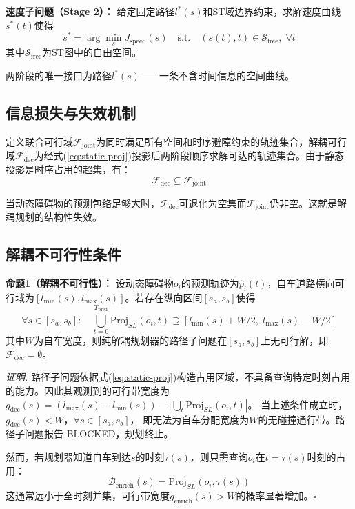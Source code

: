 \documentclass[a4paper,11pt]{article}
\begin{document}
\textbf{速度子问题（Stage 2）：} 给定固定路径$l^*(s)$和ST域边界约束，求解速度曲线$s^*(t)$使得
\begin{equation}
  s^* = \arg\min_{s} J_{\text{speed}}(s) \quad \text{s.t.} \quad (s(t), t) \in \mathcal{S}_{\text{free}}, \;\forall t
\end{equation}
其中$\mathcal{S}_{\text{free}}$为ST图中的自由空间。

两阶段的唯一接口为路径$l^*(s)$——一条不含时间信息的空间曲线。

\subsection{信息损失与失效机制}

定义联合可行域$\mathcal{F}_{\text{joint}}$为同时满足所有空间和时序避障约束的轨迹集合，解耦可行域$\mathcal{F}_{\text{dec}}$为经式(\ref{eq:static-proj})投影后两阶段顺序求解可达的轨迹集合。由于静态投影是时序占用的超集，有：
\begin{equation}
  \mathcal{F}_{\text{dec}} \subseteq \mathcal{F}_{\text{joint}}
\end{equation}

当动态障碍物的预测包络足够大时，$\mathcal{F}_{\text{dec}}$可退化为空集而$\mathcal{F}_{\text{joint}}$仍非空。这就是解耦规划的结构性失效。

\subsection{解耦不可行性条件}

\textbf{命题1（解耦不可行性）：} 设动态障碍物$o_i$的预测轨迹为$\hat{p}_i(t)$，自车道路横向可行域为$[l_{\min}(s), l_{\max}(s)]$。若存在纵向区间$[s_a, s_b]$使得
\begin{equation}
  \forall s \in [s_a, s_b]: \quad \bigcup_{t=0}^{T_{\text{pred}}} \text{Proj}_{SL}(o_i, t) \supseteq [l_{\min}(s) + W/2,\; l_{\max}(s) - W/2]
\end{equation}
其中$W$为自车宽度，则纯解耦规划器的路径子问题在$[s_a, s_b]$上无可行解，即$\mathcal{F}_{\text{dec}} = \emptyset$。

\textit{证明.} 路径子问题依据式(\ref{eq:static-proj})构造占用区域，不具备查询特定时刻占用的能力。因此其观测到的可行带宽度为
$g_{\text{dec}}(s) = (l_{\max}(s) - l_{\min}(s)) - |\bigcup_t \text{Proj}_{SL}(o_i, t)|$。
当上述条件成立时，$g_{\text{dec}}(s) < W$，$\forall s \in [s_a, s_b]$，
即无法为自车分配宽度为$W$的无碰撞通行带。路径子问题报告 BLOCKED，规划终止。

然而，若规划器知道自车到达$s$的时刻$\tau(s)$，则只需查询$o_i$在$t = \tau(s)$时刻的占用：
\begin{equation}
  \mathcal{B}_{\text{enrich}}(s) = \text{Proj}_{SL}(o_i, \tau(s))
\end{equation}
这通常远小于全时刻并集，可行带宽度$g_{\text{enrich}}(s) > W$的概率显著增加。\hfill$\square$
\end{document}
